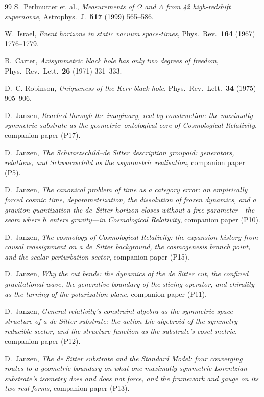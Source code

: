 \documentclass[11pt,a4paper]{article}
\theoremstyle{plain}
\theoremstyle{definition}
\theoremstyle{remark}
\begin{document}
\begin{thebibliography}{99}
S.~Perlmutter et~al.,
\emph{Measurements of $\Omega$ and $\Lambda$ from 42 high-redshift supernovae},
Astrophys.~J.~\textbf{517} (1999) 565--586.

W.~Israel,
\emph{Event horizons in static vacuum space-times},
Phys.~Rev.~\textbf{164} (1967) 1776--1779.

B.~Carter,
\emph{Axisymmetric black hole has only two degrees of freedom},
Phys.~Rev.~Lett.~\textbf{26} (1971) 331--333.

D.~C. Robinson,
\emph{Uniqueness of the Kerr black hole},
Phys.~Rev.~Lett.~\textbf{34} (1975) 905--906.

D.~Janzen,
\emph{Reached through the imaginary, real by construction: the maximally symmetric substrate as the geometric--ontological core of Cosmological Relativity}, companion paper (P17).

D.~Janzen,
\emph{The Schwarzschild--de Sitter description groupoid: generators, relations, and Schwarzschild as the asymmetric realisation}, companion paper (P5).

D.~Janzen,
\emph{The canonical problem of time as a category error: an empirically forced cosmic time, deparametrization, the dissolution of frozen dynamics, and a graviton quantization the de~Sitter horizon closes without a free parameter---the seam where $\hbar$ enters gravity---in Cosmological Relativity}, companion paper (P10).

 D.~Janzen, \emph{The cosmology of Cosmological Relativity: the expansion history from causal reassignment on a de~Sitter background, the cosmogenesis branch point, and the scalar perturbation sector}, companion paper (P15).

D.~Janzen,
\emph{Why the cut bends: the dynamics of the de Sitter cut, the confined gravitational wave, the generative boundary of the slicing operator, and chirality as the turning of the polarization plane}, companion paper (P11).

D.~Janzen,
\emph{General relativity's constraint algebra as the symmetric-space structure of a de Sitter substrate: the action Lie algebroid of the symmetry-reducible sector, and the structure function as the substrate's coset metric}, companion paper (P12).

D.~Janzen,
\emph{The de Sitter substrate and the Standard Model: four converging routes to a geometric boundary on what one maximally-symmetric Lorentzian substrate's isometry does and does not force, and the framework and gauge on its two real forms}, companion paper (P13).


\end{thebibliography}
\end{document}

